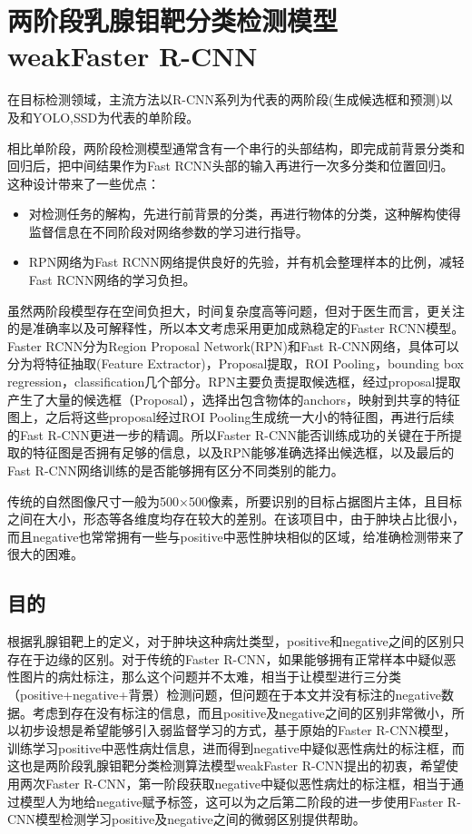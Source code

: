 \chapter{两阶段乳腺钼靶分类检测模型weakFaster R-CNN}\label{chap:stage2}

在目标检测领域，主流方法以R-CNN系列为代表的两阶段(生成候选框和预测)以及和YOLO\cite{36Redmon2015You},SSD\cite{37Liu2016SSD}为代表的单阶段。

相比单阶段，两阶段检测模型通常含有一个串行的头部结构，即完成前背景分类和回归后，把中间结果作为Fast RCNN头部的输入再进行一次多分类和位置回归。这种设计带来了一些优点：

\begin{itemize}
    \item 对检测任务的解构，先进行前背景的分类，再进行物体的分类，这种解构使得监督信息在不同阶段对网络参数的学习进行指导。
    \item RPN网络为Fast RCNN网络提供良好的先验，并有机会整理样本的比例，减轻Fast RCNN网络的学习负担。
\end{itemize}

虽然两阶段模型存在空间负担大，时间复杂度高等问题，但对于医生而言，更关注的是准确率以及可解释性，所以本文考虑采用更加成熟稳定的Faster RCNN模型。Faster RCNN分为Region Proposal Network(RPN)和Fast R-CNN网络，具体可以分为将特征抽取(Feature Extractor)，Proposal提取，ROI Pooling，bounding box regression，classification几个部分。RPN主要负责提取候选框，经过proposal提取产生了大量的候选框（Proposal），选择出包含物体的anchors，映射到共享的特征图上，之后将这些proposal经过ROI Pooling生成统一大小的特征图，再进行后续的Fast R-CNN更进一步的精调。所以Faster R-CNN能否训练成功的关键在于所提取的特征图是否拥有足够的信息，以及RPN能够准确选择出候选框，以及最后的Fast R-CNN网络训练的是否能够拥有区分不同类别的能力。

传统的自然图像尺寸一般为500×500像素，所要识别的目标占据图片主体，且目标之间在大小，形态等各维度均存在较大的差别。在该项目中，由于肿块占比很小，而且negative也常常拥有一些与positive中恶性肿块相似的区域，给准确检测带来了很大的困难。


\section{目的}
根据乳腺钼靶上的定义，对于肿块这种病灶类型，positive和negative之间的区别只存在于边缘的区别。对于传统的Faster R-CNN，如果能够拥有正常样本中疑似恶性图片的病灶标注，那么这个问题并不太难，相当于让模型进行三分类（positive+negative+背景）检测问题，但问题在于本文并没有标注的negative数据。考虑到存在没有标注的信息，而且positive及negative之间的区别非常微小，所以初步设想是希望能够引入弱监督学习的方式，基于原始的Faster R-CNN模型，训练学习positive中恶性病灶信息，进而得到negative中疑似恶性病灶的标注框，而这也是两阶段乳腺钼靶分类检测算法模型weakFaster R-CNN提出的初衷，希望使用两次Faster R-CNN，第一阶段获取negative中疑似恶性病灶的标注框，相当于通过模型人为地给negative赋予标签，这可以为之后第二阶段的进一步使用Faster R-CNN模型检测学习positive及negative之间的微弱区别提供帮助。

